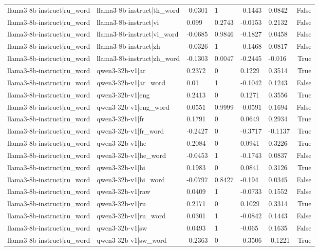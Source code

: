 \begin{table}
\begin{tabular}{llllllr}
llama3-8b-instruct|ru_word & llama3-8b-instruct|th_word & -0.0301 & 1 & -0.1443 & 0.0842 & False \\
llama3-8b-instruct|ru_word & llama3-8b-instruct|vi & 0.099 & 0.2743 & -0.0153 & 0.2132 & False \\
llama3-8b-instruct|ru_word & llama3-8b-instruct|vi_word & -0.0685 & 0.9846 & -0.1827 & 0.0458 & False \\
llama3-8b-instruct|ru_word & llama3-8b-instruct|zh & -0.0326 & 1 & -0.1468 & 0.0817 & False \\
llama3-8b-instruct|ru_word & llama3-8b-instruct|zh_word & -0.1303 & 0.0047 & -0.2445 & -0.016 & True \\
llama3-8b-instruct|ru_word & qwen3-32b-v1|ar & 0.2372 & 0 & 0.1229 & 0.3514 & True \\
llama3-8b-instruct|ru_word & qwen3-32b-v1|ar_word & 0.01 & 1 & -0.1042 & 0.1243 & False \\
llama3-8b-instruct|ru_word & qwen3-32b-v1|eng & 0.2413 & 0 & 0.1271 & 0.3556 & True \\
llama3-8b-instruct|ru_word & qwen3-32b-v1|eng_word & 0.0551 & 0.9999 & -0.0591 & 0.1694 & False \\
llama3-8b-instruct|ru_word & qwen3-32b-v1|fr & 0.1791 & 0 & 0.0649 & 0.2934 & True \\
llama3-8b-instruct|ru_word & qwen3-32b-v1|fr_word & -0.2427 & 0 & -0.3717 & -0.1137 & True \\
llama3-8b-instruct|ru_word & qwen3-32b-v1|he & 0.2084 & 0 & 0.0941 & 0.3226 & True \\
llama3-8b-instruct|ru_word & qwen3-32b-v1|he_word & -0.0453 & 1 & -0.1743 & 0.0837 & False \\
llama3-8b-instruct|ru_word & qwen3-32b-v1|hi & 0.1983 & 0 & 0.0841 & 0.3126 & True \\
llama3-8b-instruct|ru_word & qwen3-32b-v1|hi_word & -0.0797 & 0.8427 & -0.194 & 0.0345 & False \\
llama3-8b-instruct|ru_word & qwen3-32b-v1|raw & 0.0409 & 1 & -0.0733 & 0.1552 & False \\
llama3-8b-instruct|ru_word & qwen3-32b-v1|ru & 0.2171 & 0 & 0.1029 & 0.3314 & True \\
llama3-8b-instruct|ru_word & qwen3-32b-v1|ru_word & 0.0301 & 1 & -0.0842 & 0.1443 & False \\
llama3-8b-instruct|ru_word & qwen3-32b-v1|sw & 0.0493 & 1 & -0.065 & 0.1635 & False \\
llama3-8b-instruct|ru_word & qwen3-32b-v1|sw_word & -0.2363 & 0 & -0.3506 & -0.1221 & True \\

\end{tabular}
\end{table}
